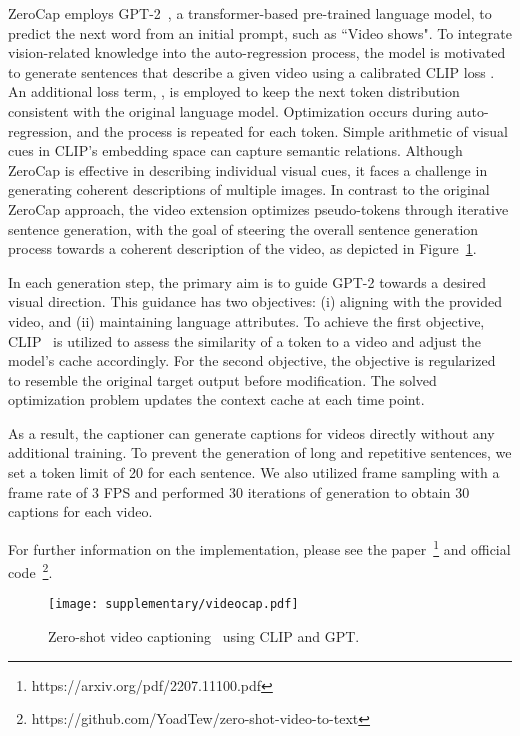 \documentclass[10pt,twocolumn,letterpaper]{article}
\begin{document}
ZeroCap employs GPT-2~\cite{GPT}, a transformer-based pre-trained language model, to predict the next word from an initial prompt, such as ``Video shows". To integrate vision-related knowledge into the auto-regression process, the model is motivated to generate sentences that describe a given video using a calibrated CLIP loss . An additional loss term, , is employed to keep the next token distribution consistent with the original language model. Optimization occurs during auto-regression, and the process is repeated for each token. Simple arithmetic of visual cues in CLIP's embedding space can capture semantic relations.
Although ZeroCap is effective in describing individual visual cues, it faces a challenge in generating coherent descriptions of multiple images. In contrast to the original ZeroCap approach, the video extension \cite{videocap} optimizes pseudo-tokens through iterative sentence generation, with the goal of steering the overall sentence generation process towards a coherent description of the video, as depicted in Figure~\ref{fig:zerocap}.

In each generation step, the primary aim is to guide GPT-2 towards a desired visual direction. This guidance has two objectives: (i) aligning with the provided video, and (ii) maintaining language attributes. To achieve the first objective, CLIP~\cite{clip} is utilized to assess the similarity of a token to a video and adjust the model's cache accordingly. For the second objective, the objective is regularized to resemble the original target output before modification. The solved optimization problem updates the context cache at each time point. 

As a result, the captioner can generate captions for videos directly without any additional training.
To prevent the generation of long and repetitive sentences, we set a token limit of 20 for each sentence. We also utilized frame sampling with a frame rate of 3 FPS and performed 30 iterations of generation to obtain 30 captions for each video.

For further information on the implementation, please see the paper~\footnote{https://arxiv.org/pdf/2207.11100.pdf} and official code~\footnote{https://github.com/YoadTew/zero-shot-video-to-text}.

\begin{figure}[t]
\begin{center}
\texttt{[image: supplementary/videocap.pdf]}
\end{center}
\caption{Zero-shot video captioning~\cite{videocap} using CLIP and GPT.
}
\label{fig:zerocap}
\end{figure}
\end{document}
